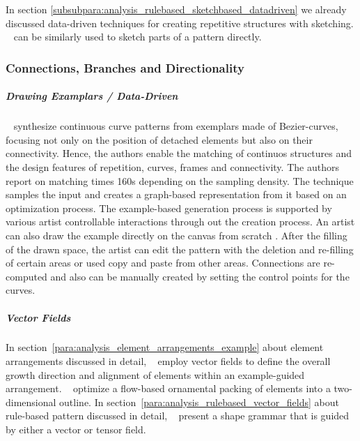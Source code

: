 
In section \ref{subsubpara:analysis_rulebased_sketchbased_datadriven} we already discussed data-driven techniques for creating repetitive structures with sketching. ~\cite{kazi_2012_vit, xing_2014_apr, xing_2015_aha} can be similarly used to sketch parts of a pattern directly.

\subsubsection{Connections, Branches and Directionality}
\label{subsubsec:analysis_connections_branches_and_directionality}




\subparagraph{Drawing Examplars / Data-Driven}
\label{subpara:analysis_connections_branches_and_directionality_drawing}



\citeauthor*{tu_2020_cct}~\cite{tu_2020_cct} synthesize continuous curve patterns from exemplars made of Bezier-curves, focusing not only on the position of detached elements but also on their connectivity. Hence, the authors enable the matching of continuos structures and the design features of repetition, curves, frames and connectivity. The authors report on matching times 160s depending on the sampling density. The technique samples the input and creates a graph-based representation from it based on an optimization process. The example-based generation process is supported by various artist controllable interactions through out the creation process. An artist can also draw the example directly on the canvas from scratch . After the filling of the drawn space, the artist can edit the pattern with the deletion and re-filling of certain areas or used copy and paste from other areas. Connections are re-computed and also can be manually created by setting the control points for the curves. 


\subparagraph{Vector Fields}
\label{subpara:analysis_connections_branches_and_directionality_vectorfields}

In section~\ref{para:analysis_element_arrangements_example} about element arrangements discussed in detail, \citeauthor*{ijiri_2008_aeb}~\cite{ijiri_2008_aeb} employ vector fields to define the overall growth direction and alignment of elements within an example-guided arrangement. \citeauthor*{saputra_2017_ffo}~\cite{saputra_2017_ffo} optimize a flow-based ornamental packing of elements into a two-dimensional outline. In section~\ref{para:analysis_rulebased_vector_fields} about rule-based pattern discussed in detail, \citeauthor*{yuanyuan_2011_gso}~\cite{yuanyuan_2011_gso} present a shape grammar that is guided by either a vector or tensor field.

